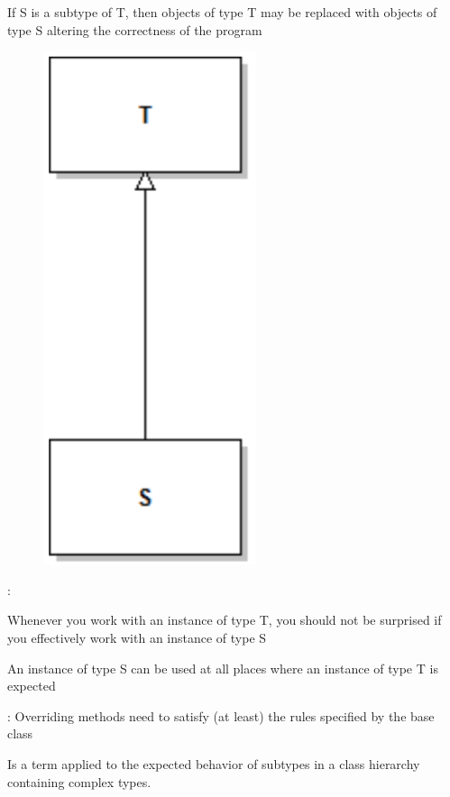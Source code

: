 \begin{defnbox}\nospacing
  \begin{defn}\label{defn:}
    If S is a subtype of T, then objects of type T may be replaced with objects of type S  altering the correctness of the program
  \end{defn}
\end{defnbox}
\begin{sectionbox}\nospacing
  \begin{figure}
		\centering
		\vspace{-10pt}
		\includegraphics[width=0.55\linewidth]{figures/intro/Lis.png}
  \end{figure}
  :
  \begin{itemizenosep}
      \item Whenever you work with an instance of type T, you should not be
    surprised if you effectively work with an instance of type S
      \item An instance of type S can be used at all places where an instance of type T is expected
  \end{itemizenosep}
  : Overriding methods need to satisfy (at least) the rules specified by the base class
\end{sectionbox}
\begin{defnbox}\nospacing
  \begin{defn}[Variance]\label{defn:Variance}
    Is a term applied to the expected behavior of subtypes in a class hierarchy containing complex types.
  \end{defn}
\end{defnbox}

